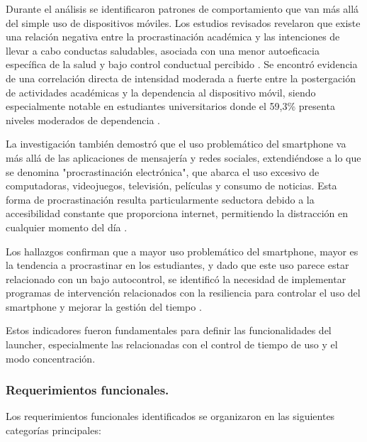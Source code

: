 Durante el análisis se identificaron patrones de comportamiento que van más allá del simple uso de dispositivos móviles. Los estudios revisados revelaron que existe una relación negativa entre la procrastinación académica y las intenciones de llevar a cabo conductas saludables, asociada con una menor autoeficacia específica de la salud y bajo control conductual percibido \cite{Vanguardia2012}. Se encontró evidencia de una correlación directa de intensidad moderada a fuerte entre la postergación de actividades académicas y la dependencia al dispositivo móvil, siendo especialmente notable en estudiantes universitarios donde el 59,3\% presenta niveles moderados de dependencia \cite{Villagomez2023}.

La investigación también demostró que el uso problemático del smartphone va más allá de las aplicaciones de mensajería y redes sociales, extendiéndose a lo que se denomina "procrastinación electrónica", que abarca el uso excesivo de computadoras, videojuegos, televisión, películas y consumo de noticias. Esta forma de procrastinación resulta particularmente seductora debido a la accesibilidad constante que proporciona internet, permitiendo la distracción en cualquier momento del día \cite{Sociedad2023}.

Los hallazgos confirman que a mayor uso problemático del smartphone, mayor es la tendencia a procrastinar en los estudiantes, y dado que este uso parece estar relacionado con un bajo autocontrol, se identificó la necesidad de implementar programas de intervención relacionados con la resiliencia para controlar el uso del smartphone y mejorar la gestión del tiempo \cite{Santillan2020}.

Estos indicadores fueron fundamentales para definir las funcionalidades del launcher, especialmente las relacionadas con el control de tiempo de uso y el modo concentración.

\subsubsection{Requerimientos funcionales.}

Los requerimientos funcionales identificados se organizaron en las siguientes categorías principales:

